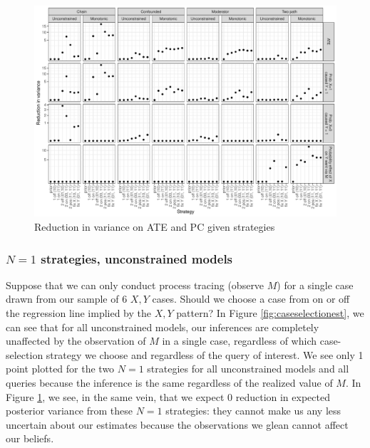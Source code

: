 \documentclass[
  12pt,
]{book}
\begin{document}
\begin{figure}

{\centering \includegraphics{ii_files/figure-latex/caseselectionvar-1} 

}

\caption{Reduction in variance on ATE and PC given strategies}\label{fig:caseselectionvar}
\end{figure}

\hypertarget{n1-strategies-unconstrained-models}{%
\subsubsection{\texorpdfstring{\(N=1\) strategies, unconstrained models}{N=1 strategies, unconstrained models}}\label{n1-strategies-unconstrained-models}}

Suppose that we can only conduct process tracing (observe \(M\)) for a single case drawn from our sample of 6 \(X,Y\) cases. Should we choose a case from on or off the regression line implied by the \(X,Y\) pattern? In Figure \ref{fig:caseselectionest}, we can see that for all unconstrained models, our inferences are completely unaffected by the observation of \(M\) in a single case, regardless of which case-selection strategy we choose and regardless of the query of interest. We see only 1 point plotted for the two \(N=1\) strategies for all unconstrained models and all queries because the inference is the same regardless of the realized value of \(M\). In Figure \ref{fig:caseselectionvar}, we see, in the same vein, that we expect 0 reduction in expected posterior variance from these \(N=1\) strategies: they cannot make us any less uncertain about our estimates because the observations we glean cannot affect our beliefs.
\end{document}

